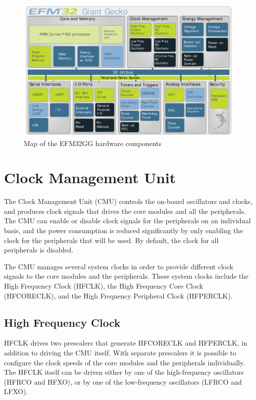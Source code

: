 \begin{figure}[ht]
  \centering
  \includegraphics[width=\textwidth]{images/giant_gecko_map.png}
  \caption{Map of the EFM32GG hardware components}\label{fig:giant-gecko-map}
\end{figure}


\section{Clock Management Unit}\label{sec:cmu}
The Clock Management Unit (CMU) controls the on-board oscillators and clocks, and produces clock signals that drives the core modules and all the peripherals. The CMU can enable or disable clock signals for the peripherals on an individual basis, and the power consumption is reduced significantly by only enabling the clock for the peripherals that will be used. By default, the clock for all peripherals is disabled. 

The CMU manages several system clocks in order to provide different clock signals to the core modules and the peripherals. These system clocks include the High Frequency Clock (HFCLK), the High Frequency Core Clock (HFCORECLK), and the High Frequency Peripheral Clock (HFPERCLK).\cite{efm32gg-rm}

\subsection{High Frequency Clock}
HFCLK drives two prescalers that generate HFCORECLK and HFPERCLK, in addition to driving the CMU itself. With separate prescalers it is possible to configure the clock speeds of the core modules and the peripherals individually. The HFCLK itself can be driven either by one of the high-frequency oscillators (HFRCO and HFXO), or by one of the low-frequency oscillators (LFRCO and LFXO). 


